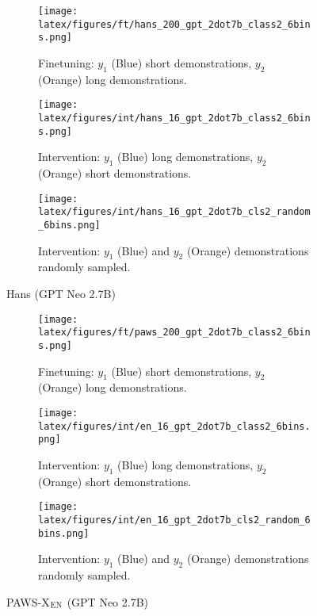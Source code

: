 \begin{figure*}[t!]
    \centering
    \begin{minipage}[t]{\linewidth}
        \begin{subfigure}{0.31\linewidth}
            \centering
            \texttt{[image: latex/figures/ft/hans\_200\_gpt\_2dot7b\_class2\_6bins.png]}
            \caption{Finetuning: $y_1$ (Blue) short demonstrations, $y_2$ (Orange) long demonstrations.}
        \end{subfigure}%
        \hfill
        \begin{subfigure}{0.31\linewidth}
            \centering
            \texttt{[image: latex/figures/int/hans\_16\_gpt\_2dot7b\_class2\_6bins.png]}
            \caption{Intervention: $y_1$ (Blue) long demonstrations, $y_2$ (Orange) short demonstrations.}
        \end{subfigure}
        \hfill
        \begin{subfigure}{0.31\linewidth}
            \centering
            \texttt{[image: latex/figures/int/hans\_16\_gpt\_2dot7b\_cls2\_random\_6bins.png]}
            \caption{Intervention: $y_1$ (Blue) and $y_2$ (Orange) demonstrations randomly sampled.}
        \end{subfigure}
    \end{minipage}%
    \hfill
    \begin{minipage}[c]{\linewidth}
        \caption{Hans (GPT Neo 2.7B)}
    \end{minipage}
\end{figure*}

\begin{figure*}[t!]
    \centering
    \begin{minipage}[t]{\linewidth}
        \begin{subfigure}{0.31\linewidth}
            \centering
            \texttt{[image: latex/figures/ft/paws\_200\_gpt\_2dot7b\_class2\_6bins.png]}
            \caption{Finetuning: $y_1$ (Blue) short demonstrations, $y_2$ (Orange) long demonstrations.}
        \end{subfigure}%
        \hfill
        \begin{subfigure}{0.31\linewidth}
            \centering
            \texttt{[image: latex/figures/int/en\_16\_gpt\_2dot7b\_class2\_6bins.png]}
            \caption{Intervention: $y_1$ (Blue) long demonstrations, $y_2$ (Orange) short demonstrations.}
        \end{subfigure}
        \hfill
        \begin{subfigure}{0.31\linewidth}
            \centering
            \texttt{[image: latex/figures/int/en\_16\_gpt\_2dot7b\_cls2\_random\_6bins.png]}
            \caption{Intervention: $y_1$ (Blue) and $y_2$ (Orange) demonstrations randomly sampled.}
        \end{subfigure}
    \end{minipage}%
    \hfill
    \begin{minipage}[c]{\linewidth}
        \caption{PAWS-X$_{\textsc{EN}}$ (GPT Neo 2.7B)}
    \end{minipage}
\end{figure*}

